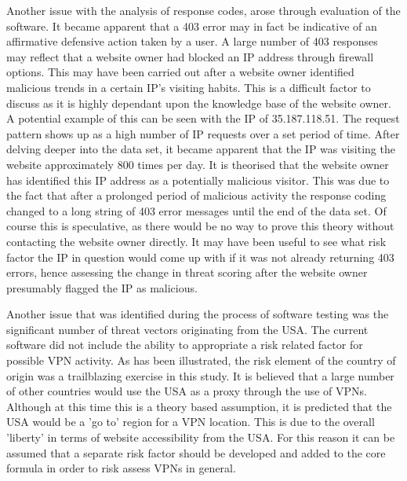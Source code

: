 Another issue with the analysis of response codes, arose through evaluation of the software. It became apparent that a 403 error may in fact be indicative of an affirmative defensive action taken by a user. A large number of 403 responses may reflect that a website owner had blocked an IP address through firewall options. This may have been carried out after a website owner identified malicious trends in a certain IP's visiting habits. This is a difficult factor to discuss as it is highly dependant upon the knowledge base of the website owner. A potential example of this can be seen with the IP of 35.187.118.51. The request pattern shows up as a high number of IP requests over a set period of time. After delving deeper into the data set, it became apparent that the IP was visiting the website approximately 800 times per day. It is theorised that the website owner has identified this IP address as a potentially malicious visitor. This was due to the fact that after a prolonged period of malicious activity the response coding changed to a long string of 403 error messages until the end of the data set. Of course this is speculative, as there would be no way to prove this theory without contacting the website owner directly. It may have been useful to see what risk factor the IP in question would come up with if it was not already returning 403 errors, hence assessing the change in threat scoring after the website owner presumably flagged the IP as malicious.

Another issue that was identified during the process of software testing was the significant number of threat vectors originating from the USA. The current software did not include the ability to appropriate a risk related factor for possible VPN activity. As has been illustrated, the risk element of the country of origin was a trailblazing exercise in this study. It is believed that a large number of other countries would use the USA as a proxy through the use of VPNs. Although at this time this is a theory based assumption, it is predicted that the USA would be a 'go to' region for a VPN location. This is due to the overall 'liberty' in terms of website accessibility from the USA. For this reason it can be assumed that a separate risk factor should be developed and added to the core formula in order to risk assess VPNs in general.

